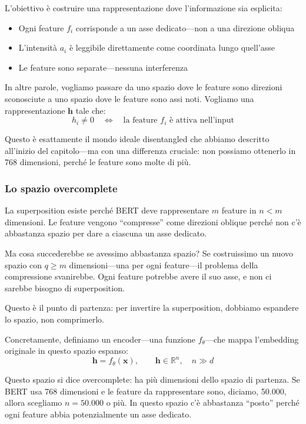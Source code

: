 L'obiettivo è costruire una rappresentazione dove l'informazione sia esplicita:
\begin{itemize}
    \item Ogni feature $f_i$ corrisponde a un asse dedicato—non a una direzione obliqua
    \item L'intensità $a_i$ è leggibile direttamente come coordinata lungo quell'asse
    \item Le feature sono separate—nessuna interferenza
\end{itemize}

In altre parole, vogliamo passare da uno spazio dove le feature sono direzioni sconosciute a uno spazio dove le feature sono assi noti. Vogliamo una rappresentazione $\mathbf{h}$ tale che:
\begin{equation}
    h_i \neq 0 \quad \Longleftrightarrow \quad \text{la feature } f_i \text{ è attiva nell'input}
\end{equation}

Questo è esattamente il mondo ideale disentangled che abbiamo descritto all'inizio del capitolo—ma con una differenza cruciale: non possiamo ottenerlo in 768 dimensioni, perché le feature sono molte di più.

\subsubsection{Lo spazio overcomplete}

La superposition esiste perché BERT deve rappresentare $m$ feature in $n < m$ dimensioni. Le feature vengono ``compresse'' come direzioni oblique perché non c'è abbastanza spazio per dare a ciascuna un asse dedicato.

Ma cosa succederebbe se avessimo abbastanza spazio? Se costruissimo un nuovo spazio con $q \geq m$ dimensioni—una per ogni feature—il problema della compressione svanirebbe. Ogni feature potrebbe avere il suo asse, e non ci sarebbe bisogno di superposition.

Questo è il punto di partenza: per invertire la superposition, dobbiamo espandere lo spazio, non comprimerlo.

Concretamente, definiamo un encoder—una funzione $f_\theta$—che mappa l'embedding originale in questo spazio espanso:
\begin{equation}
    \mathbf{h} = f_\theta(\mathbf{x}), \qquad \mathbf{h} \in \mathbb{R}^n, \quad n \gg d
\end{equation}

Questo spazio si dice overcomplete: ha più dimensioni dello spazio di partenza. Se BERT usa 768 dimensioni e le feature da rappresentare sono, diciamo, 50.000, allora scegliamo $n = 50.000$ o più. In questo spazio c'è abbastanza ``posto'' perché ogni feature abbia potenzialmente un asse dedicato.

